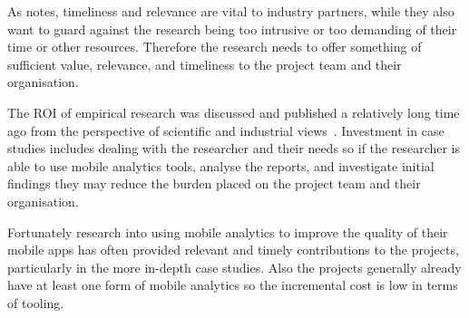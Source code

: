 As \citet[p.324]{barroca_2018_bridging_the_gap} notes, timeliness and relevance are vital to industry partners, while they also want to guard against the research being too intrusive or too demanding of their time or other resources. Therefore the research needs to offer something of sufficient value, relevance, and timeliness to the project team and their organisation. 

The ROI of empirical research was discussed and published a relatively long time ago from the perspective of scientific and industrial views~\citet[pp. 54-57]{prechelt_2007_optimizing_ROI_for_empirical_SE_studies}. Investment in case studies includes dealing with the researcher and their needs so if the researcher is able to use mobile analytics tools, analyse the reports, and investigate initial findings they may reduce the burden placed on the project team and their organisation.

Fortunately research into using mobile analytics to improve the quality of their mobile apps has often provided relevant and timely contributions to the projects, particularly in the more in-depth case studies. Also the projects generally already have at least one form of mobile analytics so the incremental cost is low in terms of tooling.
 
